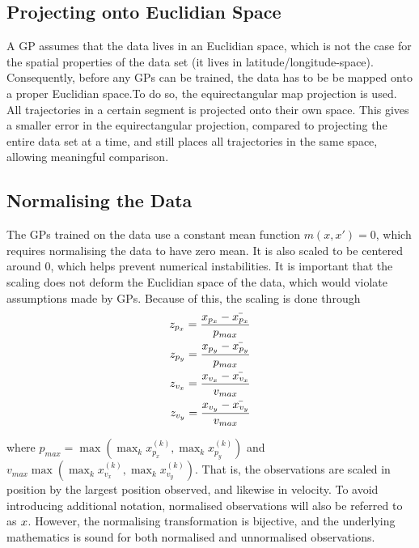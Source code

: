 \subsection{Projecting onto Euclidian Space}\label{projecting-onto-euclidian-space}
A GP assumes that the data lives in an Euclidian
space, which is not the case for the spatial properties of the data set 
(it lives in latitude/longitude-space). Consequently, before any GPs can be trained,
the data has to be be mapped onto a proper Euclidian space.To do so, 
the equirectangular map projection is used. 
All trajectories in a certain segment is projected onto their own
space. This gives a smaller error in the equirectangular projection,
compared to projecting the entire data set at a time, and still
places all trajectories in the same space, allowing 
meaningful comparison.

\subsection{Normalising the Data}\label{sec:normalising-the-data}
The GPs trained on the data use a constant mean function $m(x, x') =
0$, which requires normalising the data to have zero mean. It is also
scaled to be centered around 0, which helps prevent numerical
instabilities. It is important that the scaling does not deform the
Euclidian space of the data, which would violate assumptions made by
GPs. Because of this, the scaling is done through
\begin{equation*}
  \begin{split}
  z_{p_x} = \frac{x_{p_x}-\bar{x_{p_x}}}{p_{max}} & \\
  z_{p_y} = \frac{x_{p_y}-\bar{x_{p_y}}}{p_{max}} & \\
  z_{v_x} = \frac{x_{v_x}-\bar{x_{v_x}}}{v_{max}} & \\
  z_{v_y} = \frac{x_{v_y}-\bar{x_{v_y}}}{v_{max}} & \\
  \end{split}
\end{equation*}

where $p_{max} = \max \left( \max_k x^{(k)}_{p_x}, \max_k x^{(k)}_{p_y} \right)$ and 
$v_{max} \max \left( \max_k x^{(k)}_{v_x}, \max_k x^{(k)}_{v_y}
\right)$. That is, the observations are scaled in position by the largest
position observed, and likewise in velocity. To avoid introducing
additional notation, normalised observations will also be referred to as
$x$. However, the normalising transformation is bijective, and the
underlying mathematics is sound for both normalised and unnormalised  observations.


